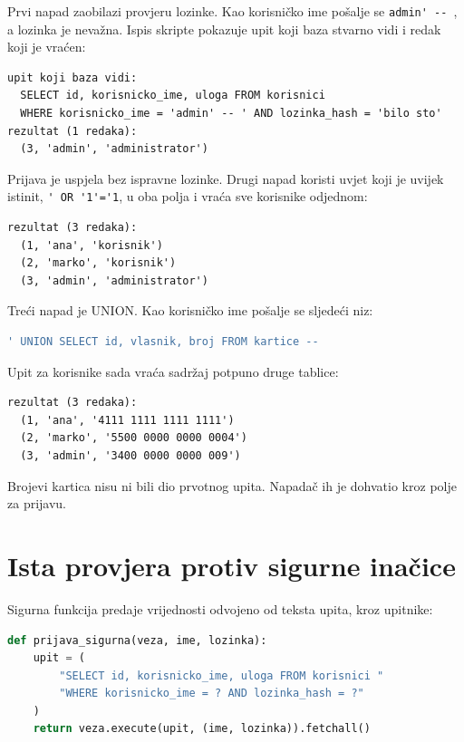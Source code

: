 \documentclass{mathos}
\begin{document}
Prvi napad zaobilazi provjeru lozinke. Kao korisničko ime pošalje se \verb|admin' -- |, a lozinka je nevažna. Ispis skripte pokazuje upit koji baza stvarno vidi i redak koji je vraćen:

\begin{lstlisting}[basicstyle=\ttfamily\scriptsize]
upit koji baza vidi:
  SELECT id, korisnicko_ime, uloga FROM korisnici
  WHERE korisnicko_ime = 'admin' -- ' AND lozinka_hash = 'bilo sto'
rezultat (1 redaka):
  (3, 'admin', 'administrator')
\end{lstlisting}

\noindent
Prijava je uspjela bez ispravne lozinke. Drugi napad koristi uvjet koji je uvijek istinit, \verb|' OR '1'='1|, u oba polja i vraća sve korisnike odjednom:

\begin{lstlisting}[basicstyle=\ttfamily\scriptsize]
rezultat (3 redaka):
  (1, 'ana', 'korisnik')
  (2, 'marko', 'korisnik')
  (3, 'admin', 'administrator')
\end{lstlisting}

\noindent
Treći napad je UNION. Kao korisničko ime pošalje se sljedeći niz:

\begin{lstlisting}[language=SQL]
' UNION SELECT id, vlasnik, broj FROM kartice --
\end{lstlisting}

\noindent
Upit za korisnike sada vraća sadržaj potpuno druge tablice:

\begin{lstlisting}[basicstyle=\ttfamily\scriptsize]
rezultat (3 redaka):
  (1, 'ana', '4111 1111 1111 1111')
  (2, 'marko', '5500 0000 0000 0004')
  (3, 'admin', '3400 0000 0000 009')
\end{lstlisting}

\noindent
Brojevi kartica nisu ni bili dio prvotnog upita. Napadač ih je dohvatio kroz polje za prijavu.

\section{Ista provjera protiv sigurne inačice}

Sigurna funkcija predaje vrijednosti odvojeno od teksta upita, kroz upitnike:

\begin{lstlisting}[language=Python, caption={Sigurna funkcija za prijavu}, label={lst:sigurna}]
def prijava_sigurna(veza, ime, lozinka):
    upit = (
        "SELECT id, korisnicko_ime, uloga FROM korisnici "
        "WHERE korisnicko_ime = ? AND lozinka_hash = ?"
    )
    return veza.execute(upit, (ime, lozinka)).fetchall()
\end{lstlisting}
\end{document}
